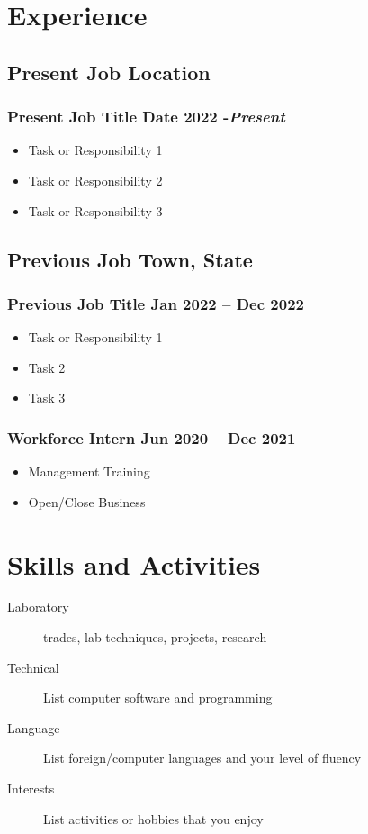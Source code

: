 \documentclass[11pt]{article}
\newcommand{\rside}[1]{
  \hfill {\normalfont\color{accent} #1}%
}
\begin{document}
\section{Experience}
\subsection{Present Job \rside{Location}}
\subsubsection{Present Job Title \rside{Date 2022 -\emph{Present}}}
\begin{itemize}
  \item Task or Responsibility 1
  \item Task or Responsibility 2 
  \item Task or Responsibility 3
\end{itemize}

\subsection{Previous Job \rside{Town, State}}
\subsubsection{Previous Job Title \rside{Jan 2022 -- Dec 2022}}
\begin{itemize}
  \item Task or Responsibility 1 
  \item Task 2 
  \item Task 3
\end{itemize}

\subsubsection{Workforce Intern \rside{Jun 2020 -- Dec 2021}}
\begin{itemize}
  \item Management Training
  \item Open/Close Business
\end{itemize}


\section{Skills and Activities}
\begin{description}
  \item[Laboratory] trades, lab techniques, projects, research
  \item[Technical] List computer software and programming  
  \item[Language] List foreign/computer languages and your level of fluency 
  \item[Interests] List activities or hobbies that you enjoy
\end{description}
\end{document}
